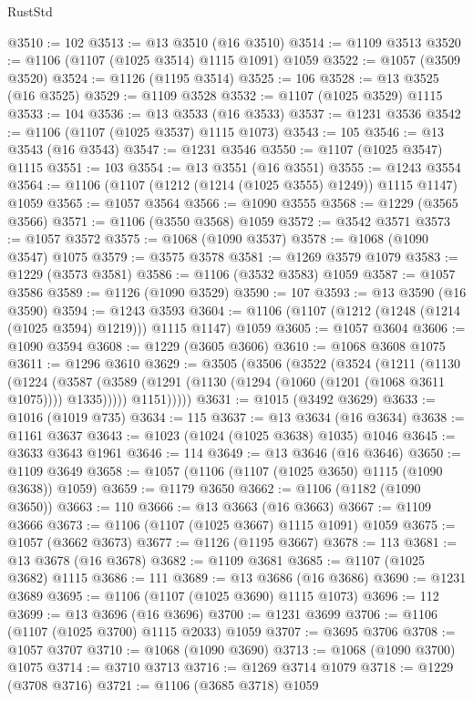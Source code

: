 \begin{lexlean}{RustStd}
\begin{coremodule}
@3510 := 102
@3513 := @13 @3510 (@16 @3510)
@3514 := @1109 @3513
@3520 := @1106 (@1107 (@1025 @3514) @1115 @1091) @1059
@3522 := @1057 (@3509 @3520)
@3524 := @1126 (@1195 @3514)
@3525 := 106
@3528 := @13 @3525 (@16 @3525)
@3529 := @1109 @3528
@3532 := @1107 (@1025 @3529) @1115
@3533 := 104
@3536 := @13 @3533 (@16 @3533)
@3537 := @1231 @3536
@3542 := @1106 (@1107 (@1025 @3537) @1115 @1073)
@3543 := 105
@3546 := @13 @3543 (@16 @3543)
@3547 := @1231 @3546
@3550 := @1107 (@1025 @3547) @1115
@3551 := 103
@3554 := @13 @3551 (@16 @3551)
@3555 := @1243 @3554
@3564 := @1106 (@1107 (@1212 (@1214 (@1025 @3555) @1249)) @1115 @1147) @1059
@3565 := @1057 @3564
@3566 := @1090 @3555
@3568 := @1229 (@3565 @3566)
@3571 := @1106 (@3550 @3568) @1059
@3572 := @3542 @3571
@3573 := @1057 @3572
@3575 := @1068 (@1090 @3537)
@3578 := @1068 (@1090 @3547) @1075
@3579 := @3575 @3578
@3581 := @1269 @3579 @1079
@3583 := @1229 (@3573 @3581)
@3586 := @1106 (@3532 @3583) @1059
@3587 := @1057 @3586
@3589 := @1126 (@1090 @3529)
@3590 := 107
@3593 := @13 @3590 (@16 @3590)
@3594 := @1243 @3593
@3604 := @1106 (@1107 (@1212 (@1248 (@1214 (@1025 @3594) @1219))) @1115 @1147) @1059
@3605 := @1057 @3604
@3606 := @1090 @3594
@3608 := @1229 (@3605 @3606)
@3610 := @1068 @3608 @1075
@3611 := @1296 @3610
@3629 := @3505
    (@3506
      (@3522
        (@3524
          (@1211
            (@1130
              (@1224
                (@3587 (@3589 (@1291 (@1130 (@1294 (@1060 (@1201 (@1068 @3611 @1075)))) @1335)))))
              @1151)))))
@3631 := @1015 (@3492 @3629)
@3633 := @1016 (@1019 @735)
@3634 := 115
@3637 := @13 @3634 (@16 @3634)
@3638 := @1161 @3637
@3643 := @1023 (@1024 (@1025 @3638) @1035) @1046
@3645 := @3633 @3643 @1961
@3646 := 114
@3649 := @13 @3646 (@16 @3646)
@3650 := @1109 @3649
@3658 := @1057 (@1106 (@1107 (@1025 @3650) @1115 (@1090 @3638)) @1059)
@3659 := @1179 @3650
@3662 := @1106 (@1182 (@1090 @3650))
@3663 := 110
@3666 := @13 @3663 (@16 @3663)
@3667 := @1109 @3666
@3673 := @1106 (@1107 (@1025 @3667) @1115 @1091) @1059
@3675 := @1057 (@3662 @3673)
@3677 := @1126 (@1195 @3667)
@3678 := 113
@3681 := @13 @3678 (@16 @3678)
@3682 := @1109 @3681
@3685 := @1107 (@1025 @3682) @1115
@3686 := 111
@3689 := @13 @3686 (@16 @3686)
@3690 := @1231 @3689
@3695 := @1106 (@1107 (@1025 @3690) @1115 @1073)
@3696 := 112
@3699 := @13 @3696 (@16 @3696)
@3700 := @1231 @3699
@3706 := @1106 (@1107 (@1025 @3700) @1115 @2033) @1059
@3707 := @3695 @3706
@3708 := @1057 @3707
@3710 := @1068 (@1090 @3690)
@3713 := @1068 (@1090 @3700) @1075
@3714 := @3710 @3713
@3716 := @1269 @3714 @1079
@3718 := @1229 (@3708 @3716)
@3721 := @1106 (@3685 @3718) @1059

\end{coremodule}
\end{lexlean}
